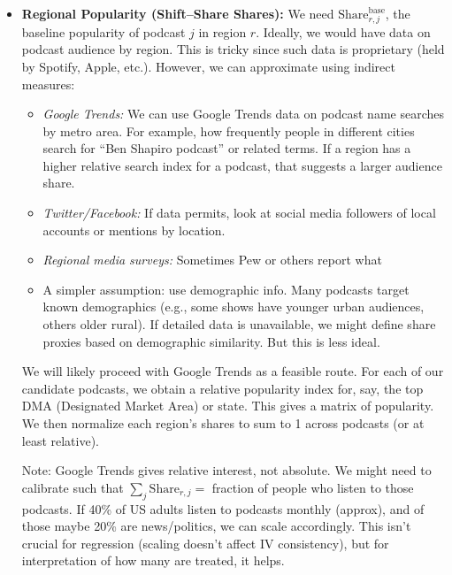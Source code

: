 \documentclass[12pt]{article}
\begin{document}
\begin{itemize}
          For economic tone, we might use a dictionary approach: count negative words related to economy or look at sentiment specifically within economic context.
    \item \textbf{Regional Popularity (Shift–Share Shares):} We need $\text{Share}_{r,j}^{\text{base}}$, the baseline popularity of podcast $j$ in region $r$. Ideally, we would have data on podcast audience by region. This is tricky since such data is proprietary (held by Spotify, Apple, etc.). However, we can approximate using indirect measures:
          \begin{itemize}
              \item \textit{Google Trends:} We can use Google Trends data on podcast name searches by metro area. For example, how frequently people in different cities search for ``Ben Shapiro podcast'' or related terms. If a region has a higher relative search index for a podcast, that suggests a larger audience share.
              \item \textit{Twitter/Facebook:} If data permits, look at social media followers of local accounts or mentions by location.
              \item \textit{Regional media surveys:} Sometimes Pew or others report what %
              \item A simpler assumption: use demographic info. Many podcasts target known demographics (e.g., some shows have younger urban audiences, others older rural). If detailed data is unavailable, we might define share proxies based on demographic similarity. But this is less ideal.
          \end{itemize}
          We will likely proceed with Google Trends as a feasible route. For each of our candidate podcasts, we obtain a relative popularity index for, say, the top DMA (Designated Market Area) or state. This gives a matrix of popularity. We then normalize each region's shares to sum to 1 across podcasts (or at least relative).

          Note: Google Trends gives relative interest, not absolute. We might need to calibrate such that $\sum_j \text{Share}_{r,j} =$ fraction of people who listen to those podcasts. If 40\% of US adults listen to podcasts monthly (approx), and of those maybe 20\% are news/politics, we can scale accordingly. This isn't crucial for regression (scaling doesn't affect IV consistency), but for interpretation of how many are treated, it helps.


\end{itemize}
\end{document}
